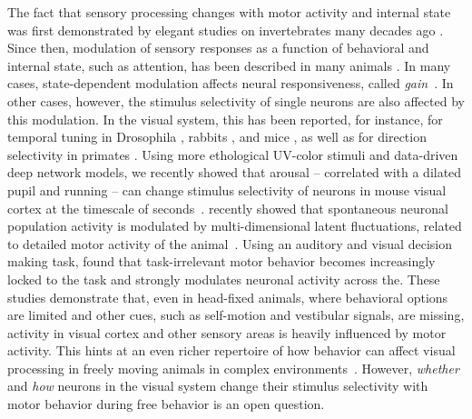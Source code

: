 \documentclass[B2,COG]{ercgrant}
\begin{document}
% 

The fact that sensory processing changes with motor activity and internal state was first demonstrated by elegant studies on invertebrates many decades ago  \parencite{Rowell1971-zj, Wiersma1968-xt}.
Since then, modulation of sensory responses as a function of behavioral and internal state, such as attention, has been described in many animals \parencite[\eg][]{Maimon2010-sa, Niell2010-bs,Bezdudnaya2006-ge, Treue1996-lp, Musall2019-kd}.
In many cases, state-dependent modulation affects neural responsiveness, called \textit{gain}~\parencite{Eggermann2014-xp, Niell2010-bs, McAdams1999-cs,Schroder2020-jl, Dadarlat2017-jw, Mineault2016-fk}.
In other cases, however, the stimulus selectivity of single neurons are also affected by this modulation. 
In the visual system, this has been reported, for instance, for temporal tuning in Drosophila \parencite{Chiappe2010-bm}, rabbits \parencite{Bezdudnaya2006-ge}, and mice \parencite{Andermann2011-vw}, as well as for direction selectivity in primates \parencite{Treue1996-lp}.
Using more ethological UV-color stimuli and data-driven deep network models, we recently showed that arousal -- correlated with a dilated pupil and running -- can change stimulus selectivity of neurons in mouse visual cortex at the timescale of seconds~\parencite{Franke2022-do}. 
\textcite{Stringer2019-lt} recently showed that spontaneous neuronal population activity is modulated by multi-dimensional latent fluctuations, related to detailed motor activity of the animal~\parencite{Syeda2022-bk}.
Using an auditory and visual decision making task, \textcite{Musall2019-kd} found that task-irrelevant motor behavior becomes increasingly locked to the task and strongly modulates neuronal activity across the.
These studies demonstrate that, even in head-fixed animals, where behavioral options are limited and other cues, such as self-motion and vestibular signals, are missing, activity in visual cortex and other sensory areas is heavily influenced by motor activity.
This hints at an even richer repertoire of how behavior can affect visual processing in freely moving animals in complex environments~\parencite{Busse2017-rt,Huk2018-ez, Datta2019-qj}.
However, \textit{whether} and \textit{how} neurons in the visual system change their stimulus selectivity with motor behavior during free behavior is an open question. 
\end{document}
